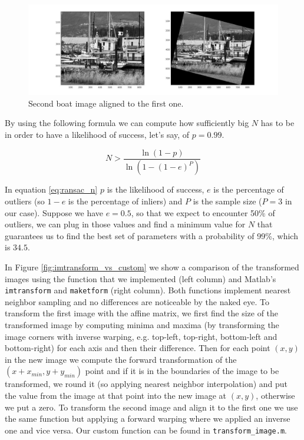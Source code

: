 \documentclass[11pt]{article}
\begin{document}
\begin{figure}[htpb]
	\centering
	\includegraphics[width=1\textwidth]{imgs/aligned_im2.jpg}
	\caption{Second boat image aligned to the first one.}
	\label{fig:aligned_im2}
\end{figure}

By using the following formula we can compute how sufficiently big $N$ has to be
in order to have a likelihood of success, let's say, of $p = 0.99$.

\begin{equation}
	N > \frac{\ln(1 - p)}{\ln(1 - (1 - e)^P)}
	\label{eq:ransac_n}
\end{equation}

In equation \ref{eq:ransac_n} $p$ is the likelihood of success, $e$ is the
percentage of outliers (so $1 - e$ is the percentage of inliers) and $P$ is the
sample size ($P = 3$ in our case). Suppose we have $e = 0.5$, so that we expect
to encounter 50\% of outliers, we can plug in those values and find a minimum
value for $N$ that guarantees us to find the best set of parameters with a
probability of 99\%, which is $34.5$.

In Figure \ref{fig:imtransform_vs_custom} we show a comparison of the
transformed images using the function that we implemented (left column) and
Matlab's \texttt{imtransform} and \texttt{maketform} (right column). Both
functions implement nearest neighbor sampling and no differences are noticeable
by the naked eye. To transform the first image with the affine matrix, we first
find the size of the transformed image by computing minima and maxima (by
transforming the image corners with inverse warping, e.g. top-left, top-right,
bottom-left and
bottom-right) for each axis and then their difference. Then for each point $(x,
y)$ in the new image we compute the forward transformation of the $(x+x_{min},
y+y_{min})$ point and if it is in the boundaries of the image to be transformed,
we round it (so applying nearest neighbor interpolation) and put the value from
the image at that point into the new image at $(x, y)$, otherwise we put a zero.
To transform the second image and align it to the first one we use the same
function but applying a forward warping where we applied an inverse one and vice
versa. Our custom function can be found in \texttt{transform\_image.m}.
\end{document}
